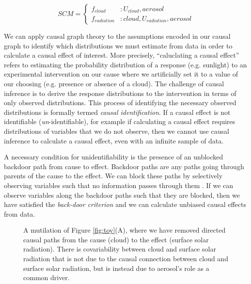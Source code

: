 \documentclass[12pt]{article}
\begin{document}
\begin{equation}
  SCM =
  \begin{cases}
    f_{cloud} &: U_{cloud}, aerosol  \\
    f_{radiation} &: cloud, U_{radiation}, aerosol
  \end{cases}
  \label{eq:2}
\end{equation}



We can apply causal graph theory
\citep[e.g.,][]{pearl1995causal,shpitser2006} to the assumptions
encoded in our causal graph to identify which distributions we must
estimate from data in order to calculate a causal effect of
interest. More precisely, ``caluclating a causal effect'' refers to
estimating the probability distribution of a response (e.g. sunlight)
to an experimental intervention on our cause where we artificially set
it to a value of our choosing (e.g. presence or absence of a
cloud). The challenge of causal inference is to derive the response
distributions to the intervention in terms of only observed
distributions. This process of identifying the necessary observed
distributions is formally termed \emph{causal identification}. If a
causal effect is not identifiable (\emph{un}-identifiable), for
example if calculating a causal effect requires distributions of
variables that we do not observe, then we cannot use causal inference
to calculate a causal effect, even with an infinite sample of data.


A necessary condition for unidentifiability is the presence of an
unblocked backdoor path from cause to effect. Backdoor paths are any
paths going through parents of the cause to the effect. We can block
these paths by selectively observing variables such that no
information passes through them \citep{geiger-d-sep}. If we can
observe variables along the backdoor paths such that they are blocked,
then we have satisfied the \emph{back-door criterion}
\citep{pearl2009} and we can calculate unbiased causal effects from
data.

\begin{figure}
  
  \caption{A mutilation of Figure \ref{fig:toy}(A), where we have
    removed directed causal paths from the cause (cloud) to the effect
    (surface solar radiation). There is covariability between cloud
    and surface solar radiation that is not due to the causal
    connection between cloud and surface solar radiation, but is
    instead due to aerosol's role as a common driver.}
  \label{fig:mutilated-toy}
\end{figure}
\end{document}
